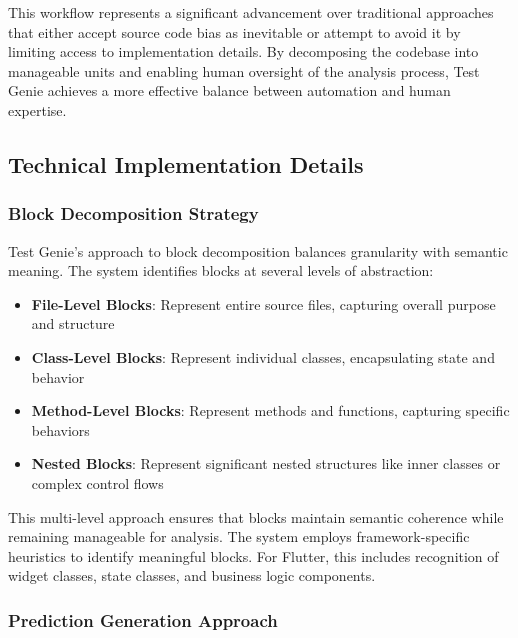 \hspace{0.5cm}This workflow represents a significant advancement over traditional approaches that either accept source code bias as inevitable or attempt to avoid it by limiting access to implementation details. By decomposing the codebase into manageable units and enabling human oversight of the analysis process, Test Genie achieves a more effective balance between automation and human expertise.

\subsection{Technical Implementation Details}

\subsubsection{Block Decomposition Strategy}

\hspace{0.5cm}Test Genie's approach to block decomposition balances granularity with semantic meaning. The system identifies blocks at several levels of abstraction:

\begin{itemize}
    \item \textbf{File-Level Blocks}: Represent entire source files, capturing overall purpose and structure
    \item \textbf{Class-Level Blocks}: Represent individual classes, encapsulating state and behavior
    \item \textbf{Method-Level Blocks}: Represent methods and functions, capturing specific behaviors
    \item \textbf{Nested Blocks}: Represent significant nested structures like inner classes or complex control flows
\end{itemize}

\hspace{0.5cm}This multi-level approach ensures that blocks maintain semantic coherence while remaining manageable for analysis. The system employs framework-specific heuristics to identify meaningful blocks. For Flutter, this includes recognition of widget classes, state classes, and business logic components.

\subsubsection{Prediction Generation Approach}

